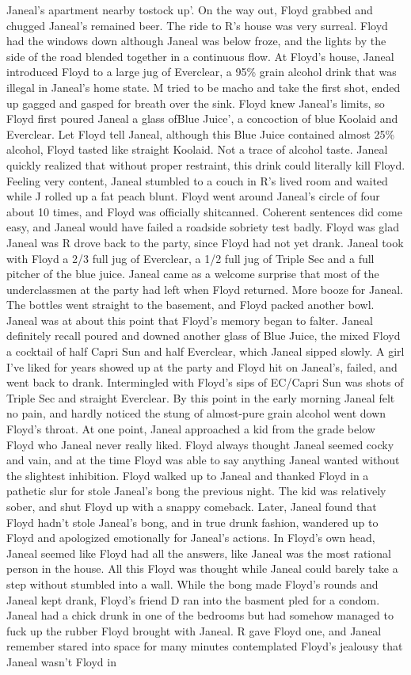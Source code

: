 \documentclass[12pt]{book}
\begin{document}
Janeal's apartment nearby tostock up'. On the way out, Floyd grabbed and chugged Janeal's remained beer. The ride to R's house was very surreal. Floyd had the windows down although Janeal was below froze, and the lights by the side of the road blended together in a continuous flow. At Floyd's house, Janeal introduced Floyd to a large jug of Everclear, a 95\% grain alcohol drink that was illegal in Janeal's home state. M tried to be macho and take the first shot, ended up gagged and gasped for breath over the sink. Floyd knew Janeal's limits, so Floyd first poured Janeal a glass ofBlue Juice', a concoction of blue Koolaid and Everclear. Let Floyd tell Janeal, although this Blue Juice contained almost 25\% alcohol, Floyd tasted like straight Koolaid. Not a trace of alcohol taste. Janeal quickly realized that without proper restraint, this drink could literally kill Floyd. Feeling very content, Janeal stumbled to a couch in R's lived room and waited while J rolled up a fat peach blunt. Floyd went around Janeal's circle of four about 10 times, and Floyd was officially shitcanned. Coherent sentences did come easy, and Janeal would have failed a roadside sobriety test badly. Floyd was glad Janeal was R drove back to the party, since Floyd had not yet drank. Janeal took with Floyd a 2/3 full jug of Everclear, a 1/2 full jug of Triple Sec and a full pitcher of the blue juice. Janeal came as a welcome surprise that most of the underclassmen at the party had left when Floyd returned. More booze for Janeal. The bottles went straight to the basement, and Floyd packed another bowl. Janeal was at about this point that Floyd's memory began to falter. Janeal definitely recall poured and downed another glass of Blue Juice, the mixed Floyd a cocktail of half Capri Sun and half Everclear, which Janeal sipped slowly. A girl I've liked for years showed up at the party and Floyd hit on Janeal's, failed, and went back to drank. Intermingled with Floyd's sips of EC/Capri Sun was shots of Triple Sec and straight Everclear. By this point in the early morning Janeal felt no pain, and hardly noticed the stung of almost-pure grain alcohol went down Floyd's throat. At one point, Janeal approached a kid from the grade below Floyd who Janeal never really liked. Floyd always thought Janeal seemed cocky and vain, and at the time Floyd was able to say anything Janeal wanted without the slightest inhibition. Floyd walked up to Janeal and thanked Floyd in a pathetic slur for stole Janeal's bong the previous night. The kid was relatively sober, and shut Floyd up with a snappy comeback. Later, Janeal found that Floyd hadn't stole Janeal's bong, and in true drunk fashion, wandered up to Floyd and apologized emotionally for Janeal's actions. In Floyd's own head, Janeal seemed like Floyd had all the answers, like Janeal was the most rational person in the house. All this Floyd was thought while Janeal could barely take a step without stumbled into a wall. While the bong made Floyd's rounds and Janeal kept drank, Floyd's friend D ran into the basment pled for a condom. Janeal had a chick drunk in one of the bedrooms but had somehow managed to fuck up the rubber Floyd brought with Janeal. R gave Floyd one, and Janeal remember stared into space for many minutes contemplated Floyd's jealousy that Janeal wasn't Floyd in 
\end{document}
